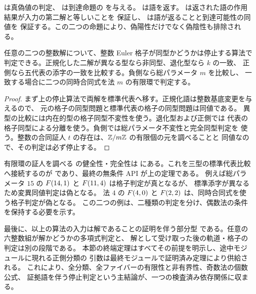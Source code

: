  は真偽値の判定、
 は到達命題の  を与える。
 は語を返す。
 は返された語の作用結果が入力の第二解と等しいことを
保証し、 は語が返ることと到達可能性の同値を
保証する。この二つの命題により、偽陽性だけでなく偽陰性も排除される。

\begin{theorem}[任意の解の整数格子同型判定]
\label{bp:alg-lattice}
\leanok
{}
任意の二つの整数解について、整数 Euler 格子が同型かどうかは停止する算法で
判定できる。正規化した二解が異なる型なら非同型、退化型なら $k$ の一致、
正側なら五代表の添字の一致を比較する。負側なら総パラメータ $m$ を比較し、
一致する場合に二つの同時合同式を法 $m$ の有限環で判定する。
\end{theorem}
\begin{proof}
\leanok
まず上の停止算法で両解を標準代表へ移す。正規化語は整数基底変更を与えるので、
元の格子の同型問題と標準代表の格子の同型問題は同値である。
異型の比較には内在的型の格子同型不変性を使う。退化型および正側では
代表の格子同型による分離を使う。負側では総パラメータ不変性と完全同型判定を
使う。整数の合同証人 $t$ の存在は、$\mathbb Z/m\mathbb Z$ の有限個の元を調べることと
同値なので、その判定は必ず停止する。
\end{proof}

有限環の証人を調べる  の健全性・完全性は
 にある。これを三型の標準代表比較へ接続するのが
 であり、最終の無条件 API が上の定理である。
例えば総パラメータ $15$ の $F(14,1)$ と $F(11,4)$ は格子判定が真となるが、
標準添字が異なるため変異同値判定は偽となる。
法 $4$ の $F(4,0)$ と $F(2,2)$ は、同時合同式を使う格子判定が偽となる。
この二つの例は、二種類の判定を分け、偶数法の条件を保持する必要を示す。

最後に、以上の算法の入力は解であることの証明を伴う部分型
 である。任意の六整数組が解かどうかの多項式判定と、
解として受け取った後の軌道・格子の判定は別の段階である。
本節の終端定理はすべてその前提を明示し、途中モジュールに現れる正側分類の
引数は最終モジュールで証明済み定理により供給される。
これにより、全分類、全ファイバーの有限性と非有界性、奇数法の個数公式、
証拠語を伴う停止判定という主結論が、一つの検査済み依存関係に収まる。
